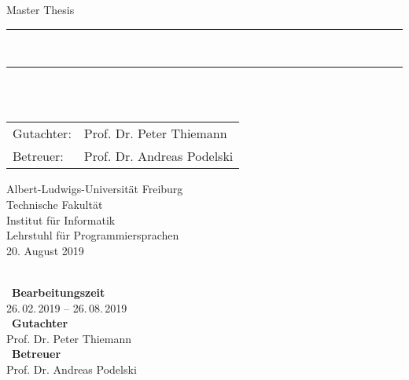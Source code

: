 \begin{titlepage}
\begin{center}

\newcommand{\HorizontalLine}{\rule{\linewidth}{0.3mm}}

{\Large Master Thesis}\\[1.3cm]


\HorizontalLine \\[0.4cm]
{ \huge \bfseries \thetitle }
\HorizontalLine \\[1.5cm]


{\Huge \theauthor} \\[2cm]


\begin{tabular}[hc]{>{\huge}l >{\huge}l}
  Gutachter: & Prof. Dr. Peter Thiemann \\[0.3cm]
  Betreuer: & Prof. Dr. Andreas Podelski \\[1.2cm]
\end{tabular}
\vfill  %

\Large {
    Albert-Ludwigs-Universität Freiburg\\
    Technische Fakultät\\
    Institut für Informatik\\
    Lehrstuhl für Programmiersprachen\\[1cm]

    20. August 2019
    \\
}
\end{center}
\end{titlepage}

\thispagestyle{empty}
\ \vfill \ \\  %
\
\textbf{Bearbeitungszeit}            \smallskip{} \\
26.\,02.\,2019 -- 26.\,08.\,2019   \bigskip{} \\
\
\textbf{Gutachter}                  \smallskip{} \\
Prof. Dr. Peter Thiemann               \bigskip{} \\
\
\textbf{Betreuer}                  \smallskip{} \\
Prof. Dr. Andreas Podelski
